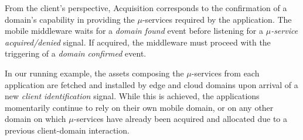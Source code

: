 
%
%	
%	
%	


From the client's perspective, Acquisition corresponds to the confirmation of a domain's capability in providing the $\mu$-services required by the application. The mobile middleware waits for a \textit{domain found} event before listening for a \textit{$\mu$-service acquired/denied} signal. If acquired, the middleware must proceed with the triggering of a \textit{domain confirmed} event.

In our running example, the assets composing the $\mu$-services from each application are fetched and installed by edge and cloud domains upon arrival of a new \textit{client identification} signal. While this is achieved, the applications momentarily continue to rely on their own mobile domain, or on any other domain on which $\mu$-services have already been acquired and allocated due to a previous client-domain interaction.

